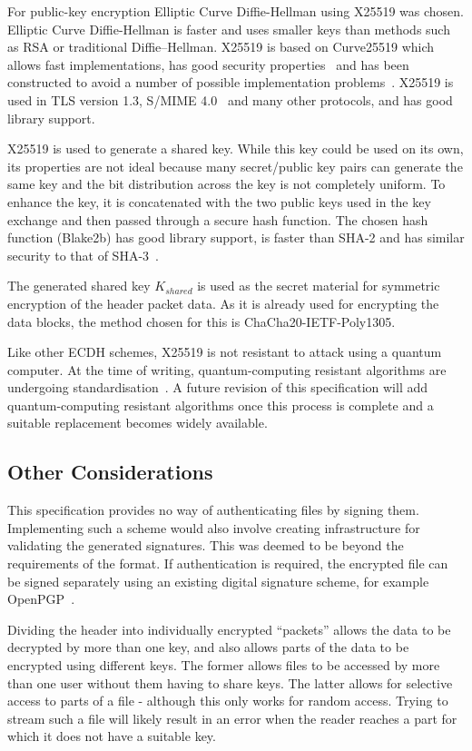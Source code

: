 \documentclass[10pt]{article}
\begin{document}
For public-key encryption Elliptic Curve Diffie-Hellman using X25519 was chosen.
Elliptic Curve Diffie-Hellman is faster and uses smaller keys than methods such as RSA or traditional Diffie–Hellman.
X25519 is based on Curve25519 which allows fast implementations, has good security properties~\cite{Curve25519}
and has been constructed to avoid a number of possible implementation problems~\cite{SafeCurves}.
X25519 is used in TLS version 1.3, S/MIME 4.0~\cite{RFC8551} and many other protocols, and has good library support.

X25519 is used to generate a shared key.
While this key could be used on its own, its properties are not ideal because many secret/public key pairs can
generate the same key and the bit distribution across the key is not completely uniform.
To enhance the key, it is concatenated with the two public keys used in the key exchange and then passed through
a secure hash function.
The chosen hash function (Blake2b) has good library support,
is faster than SHA-2 and has similar security to that of SHA-3~\cite{Blake2}.

The generated shared key $K_{shared}$ is used as the secret material for symmetric encryption of the header packet data.
As it is already used for encrypting the data blocks, the method chosen for this is ChaCha20-IETF-Poly1305.

Like other ECDH schemes, X25519 is not resistant to attack using a quantum computer.
At the time of writing, quantum-computing resistant algorithms are undergoing standardisation~\cite{Post-Quantum}.
A future revision of this specification will add quantum-computing resistant algorithms once this process
is complete and a suitable replacement becomes widely available.

\subsection{Other Considerations}

This specification provides no way of authenticating files by signing them.
Implementing such a scheme would also involve creating infrastructure for validating the generated signatures.
This was deemed to be beyond the requirements of the format.
If authentication is required, the encrypted file can be signed separately using an existing digital signature scheme,
for example OpenPGP~\cite{RFC4880}.

Dividing the header into individually encrypted ``packets'' allows the data to be decrypted by more than one key,
and also allows parts of the data to be encrypted using different keys.
The former allows files to be accessed by more than one user without them having to share keys.
The latter allows for selective access to parts of a file - although this only works for random access.
Trying to stream such a file will likely result in an error when the reader reaches a part for which it does not have
a suitable key.
\end{document}
